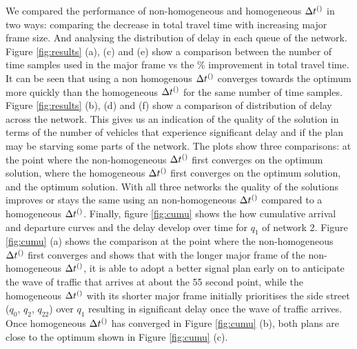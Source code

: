 We compared the performance of non-homogeneous and homogeneous $\DT[]$ in two ways: comparing the decrease in total travel time with increasing major frame size. And analysing the distribution of delay in each queue of the network. Figure \ref{fig:results} (a), (c) and (e) show a comparison between the number of time samples used in the major frame vs the \% improvement in total travel time. It can be seen that using a non homogenous $\DT[]$ converges towards the optimum more quickly than the homogeneous $\DT[]$ for the same number of time samples. Figure \ref{fig:results} (b), (d) and (f) show a comparison of distribution of delay across the network. This gives us an indication of the quality of the solution in terms of the number of vehicles that experience significant delay and if the plan may be starving some parts of the network.  The plots show three comparisons: at the point where the non-homogeneous $\DT[]$ first converges on the optimum solution, where the homogeneous $\DT[]$ first converges on the optimum solution, and the optimum solution. With all three networks the quality of the solutions improves or stays the same using an non-homogeneous $\DT[]$ compared to a homogeneous $\DT[]$.
Finally, figure \ref{fig:cumu} shows the how cumulative arrival and departure curves and the delay develop over time for $q_1$ of network 2. Figure \ref{fig:cumu} (a) shows the comparison at the point where the non-homogeneous $\DT[]$ first converges and shows that with the longer major frame of the non-homogeneous $\DT[]$, it is able to adopt a better signal plan early on to anticipate the wave of traffic that arrives at about the 55 second point, while the homogeneous $\DT[]$ with its shorter major frame initially prioritises the side street ($q_0$, $q_2$, $q_{22}$) over $q_1$ resulting in significant delay once the wave of traffic arrives. Once homogeneous $\DT[]$ has converged in Figure \ref{fig:cumu} (b), both plans are close to the optimum shown in Figure \ref{fig:cumu} (c).

